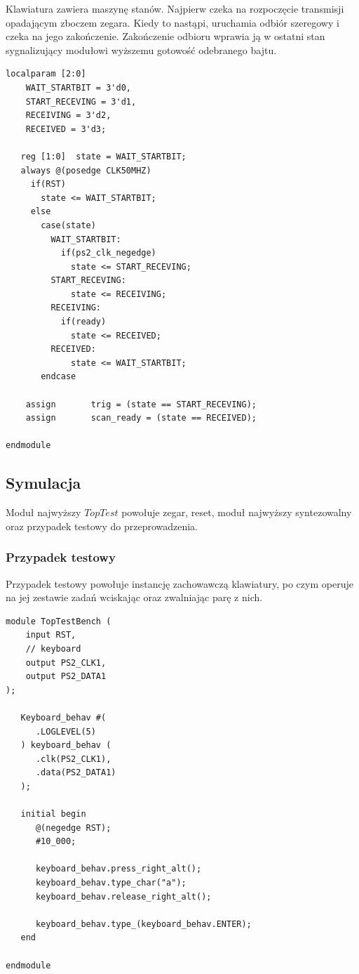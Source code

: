 \documentclass[a4paper,12pt]{article}
\begin{document}
Klawiatura zawiera maszynę stanów. Najpierw czeka na rozpoczęcie transmisji opadającym zboczem zegara. Kiedy to nastąpi, uruchamia odbiór szeregowy i czeka na jego zakończenie. Zakończenie odbioru wprawia ją w ostatni stan sygnalizujący modułowi wyższemu gotowość odebranego bajtu.
\begin{lstlisting}[label=Keyboard,caption=Keyboard.v,firstnumber=42]
   localparam [2:0]
    WAIT_STARTBIT = 3'd0,
    START_RECEVING = 3'd1,
    RECEIVING = 3'd2,
    RECEIVED = 3'd3;

   reg [1:0]  state = WAIT_STARTBIT;
   always @(posedge CLK50MHZ)
     if(RST)
       state <= WAIT_STARTBIT;
     else
       case(state)
         WAIT_STARTBIT:
           if(ps2_clk_negedge)
             state <= START_RECEVING;
         START_RECEVING:
             state <= RECEIVING;
         RECEIVING:
           if(ready)
             state <= RECEIVED;
         RECEIVED:
             state <= WAIT_STARTBIT;
       endcase

    assign       trig = (state == START_RECEVING);
    assign       scan_ready = (state == RECEIVED);

endmodule
\end{lstlisting}


\subsection{Symulacja}

Moduł najwyższy $TopTest$ powołuje zegar, reset, moduł najwyższy syntezowalny oraz przypadek testowy do przeprowadzenia.

\subsubsection{Przypadek testowy}

Przypadek testowy powołuje instancję zachowawczą klawiatury, po czym operuje na jej zestawie zadań wciskając oraz zwalniając parę z nich.
\begin{lstlisting}[label=TopTestBench,caption=TopTestBench.v]
module TopTestBench (
    input RST,
    // keyboard
    output PS2_CLK1,
    output PS2_DATA1
);

   Keyboard_behav #(
      .LOGLEVEL(5)
   ) keyboard_behav (
      .clk(PS2_CLK1),
      .data(PS2_DATA1)
   );

   initial begin
      @(negedge RST);
      #10_000;

      keyboard_behav.press_right_alt();
      keyboard_behav.type_char("a");
      keyboard_behav.release_right_alt();

      keyboard_behav.type_(keyboard_behav.ENTER);
   end

endmodule
\end{lstlisting}
\end{document}
